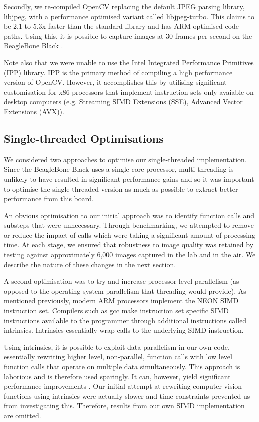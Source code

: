 \documentclass{acm_proc_article-sp}
\begin{document}
Secondly, we re-compiled OpenCV replacing the default JPEG parsing library, libjpeg, with a performance optimised variant called libjpeg-turbo. This claims to be 2.1 to 5.3x faster than the standard library \cite{libjpeg-turbo} and has ARM optimised code paths. Using this, it is possible to capture images at 30 frames per second on the BeagleBone Black \cite{bbb-30fps}.

Note also that we were unable to use the Intel Integrated Performance Primitives (IPP) library. IPP is the primary method of compiling a high performance version of OpenCV. However, it accomplishes this by utilising significant customisation for x86 processors that implement instruction sets only avaiable on desktop computers (e.g. Streaming SIMD Extensions (SSE), Advanced Vector Extensions (AVX)). 

\subsection{Single-threaded Optimisations}
We considered two approaches to optimise our single-threaded implementation. Since the BeagleBone Black uses a single core processor, multi-threading is unlikely to have resulted in significant performance gains and so it was important to optimise the single-threaded version as much as possible to extract better performance from this board. 

An obvious optimisation to our initial approach was to identify function calls and substeps that were unnecessary. Through benchmarking, we attempted to remove or reduce the impact of calls which were taking a significant amount of processing time. At each stage, we ensured that robustness to image quality was retained by testing against approximately 6,000 images captured in the lab and in the air. We describe the nature of these changes in the next section.

A second optimisation was to try and increase processor level parallelism (as opposed to the operating system parallelism that threading would provide). As mentioned previously, modern ARM processors implement the NEON SIMD instruction set. Compilers such as gcc make instruction set specific SIMD instructions available to the programmer through additional instructions called intrinsics. Intrinsics essentially wrap calls to the underlying SIMD instruction.

Using intrinsics, it is possible to exploit data parallelism in our own code, essentially rewriting higher level, non-parallel, function calls with low level function calls that operate on multiple data simultaneously. This approach is laborious and is therefore used sparingly. It can, however, yield significant performance improvements \cite{mitra2013use}. Our initial attempt at rewriting computer vision functions using intrinsics were actually slower and time constraints prevented us from investigating this. Therefore, results from our own SIMD implementation are omitted.
\end{document}
